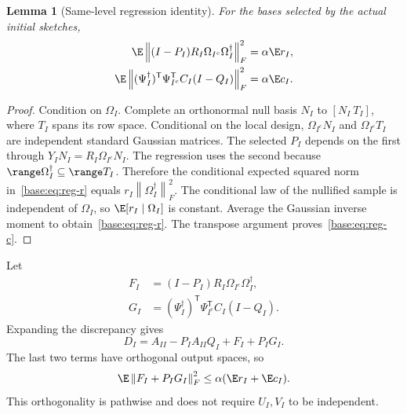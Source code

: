 \documentclass[11pt,oneside,openany,a4paper]{book}
\numberwithin{equation}{chapter}
\newtheorem{lemma}[theorem]{Lemma}
\theoremstyle{definition}
\theoremstyle{remark}
\newcommand{\T}{\mathsf T}\newcommand{\Id}{I}
\newcommand{\F}[1]{\left\lVert#1\right\rVert_F}
\begin{document}
\begin{lemma}[Same-level regression identity]\label{base:lem:same-level}
For the bases selected by the actual initial sketches,
\begin{align}
 \E\F{(I-P_I)R_I\Omega_{I^c}\Omega_I^\dagger}^2
     &=\alpha\E r_I,\label{base:eq:reg-r}\\
 \E\F{(\Psi_I^\dagger)^{\T}\Psi_{I^c}^{\T} C_I(I-Q_I)}^2
     &=\alpha\E c_I.\label{base:eq:reg-c}
\end{align}
\end{lemma}
\begin{proof}
Condition on $\Omega_I$. Complete an orthonormal null basis $N_I$ to
$[N_I\ T_I]$, where $T_I$ spans its row space. Conditional on the local
design, $\Omega_{I^c}N_I$ and $\Omega_{I^c}T_I$ are independent standard
Gaussian matrices. The selected $P_I$ depends on the first through
$Y_I N_I=R_I\Omega_{I^c}N_I$. The regression uses the second because
$\range\Omega_I^\dagger\subseteq\range T_I$.
Therefore the conditional expected squared norm in~\eqref{base:eq:reg-r} equals
$r_I\F{\Omega_I^\dagger}^2$. The conditional law of the nullified sample
is independent of $\Omega_I$, so $\E[r_I\mid\Omega_I]$ is constant.
Average the Gaussian inverse moment to obtain~\eqref{base:eq:reg-r}.
The transpose argument proves~\eqref{base:eq:reg-c}.\end{proof}

Let
\begin{align}
 F_I&=(I-P_I)R_I\Omega_{I^c}\Omega_I^\dagger,\label{base:eq:F-local}\\
 G_I&=(\Psi_I^\dagger)^{\T}\Psi_{I^c}^{\T} C_I(I-Q_I).\label{base:eq:G-local}
\end{align}
Expanding the discrepancy gives
\begin{equation}\label{base:eq:D-expansion}
 D_I=A_{II}-P_IA_{II}Q_I+F_I+P_IG_I.
\end{equation}
The last two terms have orthogonal output spaces, so
\begin{equation}\label{base:eq:diag-bound}
 \E\F{F_I+P_IG_I}^2\le\alpha(\E r_I+\E c_I).
\end{equation}
This orthogonality is pathwise and does not require $U_I,V_I$ to be
independent.
\end{document}
